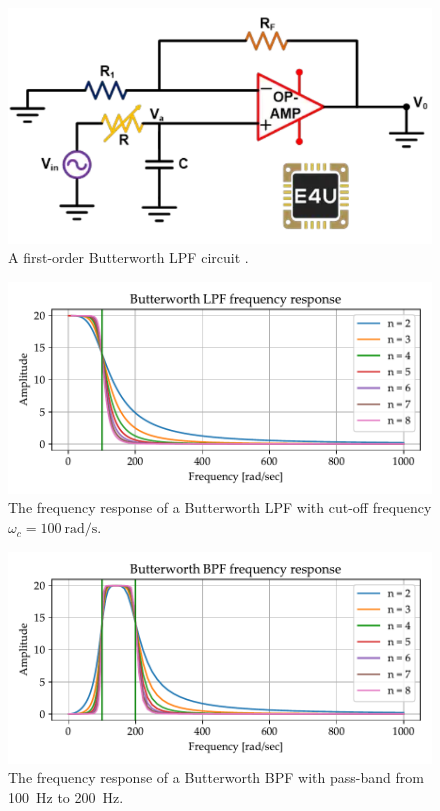 \documentclass[../ECE459FinalProjectReport.tex]{subfiles}
\begin{document}
\begin{figure}[tb]
    \centering
    \includegraphics[scale=.5]{plots/1order_butterLPF.png}
    \caption{A first-order Butterworth LPF circuit \cite{ButterworthFilterWhat2021}.}
    \label{fig:butter-ckt}
\end{figure}
\begin{figure}[tb]
    \centering
    \includegraphics[scale=.6]{plots/butterworth-lpf-nolog.pdf}
    \caption{The frequency response of a Butterworth LPF with cut-off frequency $\omega_c = \SI{100}{\radian\per\s}$.}
    \label{fig:butter-lpf}
\end{figure}
\begin{figure}[tb]
    \centering
    \includegraphics[scale=.6]{plots/butterworth-bpf-nolog.pdf}
    \caption{The frequency response of a Butterworth BPF with pass-band from \SI{100}{Hz} to \SI{200}{Hz}.}
    \label{fig:butter-bpf}
\end{figure}
\end{document}
